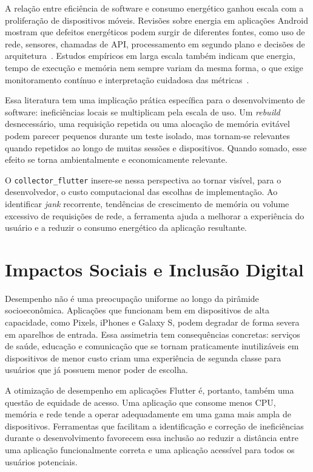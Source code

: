 A relação entre eficiência de software e consumo energético ganhou escala com a proliferação de dispositivos móveis. Revisões sobre energia em aplicações Android mostram que defeitos energéticos podem surgir de diferentes fontes, como uso de rede, sensores, chamadas de API, processamento em segundo plano e decisões de arquitetura~\cite{sun2023energyinefficiency}. Estudos empíricos em larga escala também indicam que energia, tempo de execução e memória nem sempre variam da mesma forma, o que exige monitoramento contínuo e interpretação cuidadosa das métricas~\cite{rua2024largescale}.

Essa literatura tem uma implicação prática específica para o desenvolvimento de software: ineficiências locais se multiplicam pela escala de uso. Um \textit{rebuild} desnecessário, uma requisição repetida ou uma alocação de memória evitável podem parecer pequenos durante um teste isolado, mas tornam-se relevantes quando repetidos ao longo de muitas sessões e dispositivos. Quando somado, esse efeito se torna ambientalmente e economicamente relevante.

O \texttt{collector\_flutter} insere-se nessa perspectiva ao tornar visível, para o desenvolvedor, o custo computacional das escolhas de implementação. Ao identificar \textit{jank} recorrente, tendências de crescimento de memória ou volume excessivo de requisições de rede, a ferramenta ajuda a melhorar a experiência do usuário e a reduzir o consumo energético da aplicação resultante.

\section{Impactos Sociais e Inclusão Digital}

Desempenho não é uma preocupação uniforme ao longo da pirâmide socioeconômica. Aplicações que funcionam bem em dispositivos de alta capacidade, como Pixels, iPhones e Galaxy S, podem degradar de forma severa em aparelhos de entrada. Essa assimetria tem consequências concretas: serviços de saúde, educação e comunicação que se tornam praticamente inutilizáveis em dispositivos de menor custo criam uma experiência de segunda classe para usuários que já possuem menor poder de escolha.

A otimização de desempenho em aplicações Flutter é, portanto, também uma questão de equidade de acesso. Uma aplicação que consome menos CPU, memória e rede tende a operar adequadamente em uma gama mais ampla de dispositivos. Ferramentas que facilitam a identificação e correção de ineficiências durante o desenvolvimento favorecem essa inclusão ao reduzir a distância entre uma aplicação funcionalmente correta e uma aplicação acessível para todos os usuários potenciais.

